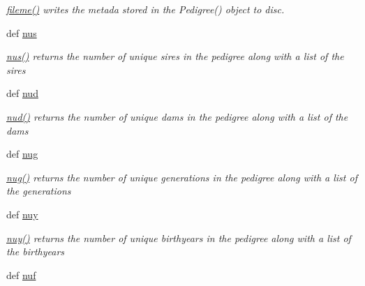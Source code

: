 \begin{DoxyCompactItemize}
\begin{DoxyCompactList}\small\item\em \hyperlink{classPyPedal_1_1pyp__newclasses_1_1PedigreeMetadata_a8af37f0f55bc77dca77228986185fbe7}{fileme()} writes the metada stored in the Pedigree() object to disc. \end{DoxyCompactList}\item 
def \hyperlink{classPyPedal_1_1pyp__newclasses_1_1PedigreeMetadata_aab430a7cc66838ce6f75a80fa8fd2884}{nus}
\begin{DoxyCompactList}\small\item\em \hyperlink{classPyPedal_1_1pyp__newclasses_1_1PedigreeMetadata_aab430a7cc66838ce6f75a80fa8fd2884}{nus()} returns the number of unique sires in the pedigree along with a list of the sires \end{DoxyCompactList}\item 
def \hyperlink{classPyPedal_1_1pyp__newclasses_1_1PedigreeMetadata_a9330d9f4d5d9ce616a57db3b8fae95b1}{nud}
\begin{DoxyCompactList}\small\item\em \hyperlink{classPyPedal_1_1pyp__newclasses_1_1PedigreeMetadata_a9330d9f4d5d9ce616a57db3b8fae95b1}{nud()} returns the number of unique dams in the pedigree along with a list of the dams \end{DoxyCompactList}\item 
def \hyperlink{classPyPedal_1_1pyp__newclasses_1_1PedigreeMetadata_a41af77f90422ded81869fd3f2a8a80f9}{nug}
\begin{DoxyCompactList}\small\item\em \hyperlink{classPyPedal_1_1pyp__newclasses_1_1PedigreeMetadata_a41af77f90422ded81869fd3f2a8a80f9}{nug()} returns the number of unique generations in the pedigree along with a list of the generations \end{DoxyCompactList}\item 
def \hyperlink{classPyPedal_1_1pyp__newclasses_1_1PedigreeMetadata_a7f51c5a6914509ec324afde82f245253}{nuy}
\begin{DoxyCompactList}\small\item\em \hyperlink{classPyPedal_1_1pyp__newclasses_1_1PedigreeMetadata_a7f51c5a6914509ec324afde82f245253}{nuy()} returns the number of unique birthyears in the pedigree along with a list of the birthyears \end{DoxyCompactList}\item 
def \hyperlink{classPyPedal_1_1pyp__newclasses_1_1PedigreeMetadata_a2fa68d278b69bda83c344c5f0615e25c}{nuf}

\end{DoxyCompactItemize}
